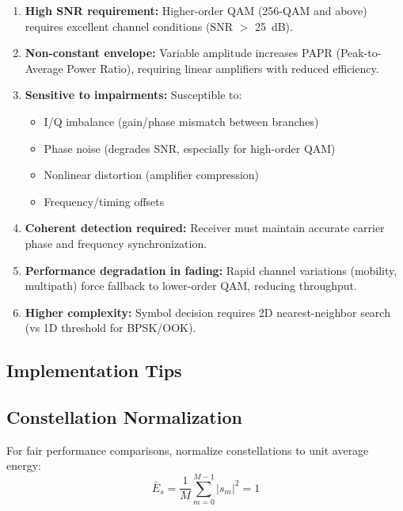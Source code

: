 \begin{enumerate}
\item \textbf{High SNR requirement:} Higher-order QAM (256-QAM and above) requires excellent channel conditions (SNR $>$ 25~dB).

\item \textbf{Non-constant envelope:} Variable amplitude increases PAPR (Peak-to-Average Power Ratio), requiring linear amplifiers with reduced efficiency.

\item \textbf{Sensitive to impairments:} Susceptible to:
  \begin{itemize}
  \item I/Q imbalance (gain/phase mismatch between branches)
  \item Phase noise (degrades SNR, especially for high-order QAM)
  \item Nonlinear distortion (amplifier compression)
  \item Frequency/timing offsets
  \end{itemize}

\item \textbf{Coherent detection required:} Receiver must maintain accurate carrier phase and frequency synchronization.

\item \textbf{Performance degradation in fading:} Rapid channel variations (mobility, multipath) force fallback to lower-order QAM, reducing throughput.

\item \textbf{Higher complexity:} Symbol decision requires 2D nearest-neighbor search (vs 1D threshold for BPSK/OOK).
\end{enumerate}

\subsection{Implementation Tips}

\subsection{Constellation Normalization}

For fair performance comparisons, normalize constellations to unit average energy:
\begin{equation}
\bar{E}_s = \frac{1}{M}\sum_{m=0}^{M-1} |s_m|^2 = 1
\label{eq:constellation-normalization}
\end{equation}

